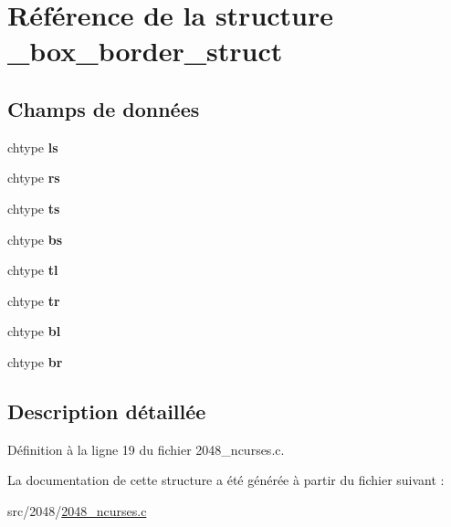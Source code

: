 \hypertarget{struct__box__border__struct}{
\section{Référence de la structure \_\-box\_\-border\_\-struct}
\label{struct__box__border__struct}
}
\subsection*{Champs de données}
\begin{DoxyCompactItemize}
\item 
\hypertarget{struct__box__border__struct_abd02d40f8d96464f6dbe6ed060b3b41f}{
chtype {\bfseries ls}}
\label{struct__box__border__struct_abd02d40f8d96464f6dbe6ed060b3b41f}

\item 
\hypertarget{struct__box__border__struct_a05a226a5255a8f41758bf472b413d4b8}{
chtype {\bfseries rs}}
\label{struct__box__border__struct_a05a226a5255a8f41758bf472b413d4b8}

\item 
\hypertarget{struct__box__border__struct_a47e109d09ccf275373c5d506c4e02a33}{
chtype {\bfseries ts}}
\label{struct__box__border__struct_a47e109d09ccf275373c5d506c4e02a33}

\item 
\hypertarget{struct__box__border__struct_a8f26ca799654e1384cfdf8e2f28b684c}{
chtype {\bfseries bs}}
\label{struct__box__border__struct_a8f26ca799654e1384cfdf8e2f28b684c}

\item 
\hypertarget{struct__box__border__struct_a3765e16187b3db788f6f97068c1a4872}{
chtype {\bfseries tl}}
\label{struct__box__border__struct_a3765e16187b3db788f6f97068c1a4872}

\item 
\hypertarget{struct__box__border__struct_a6f4b92e965aa2ec4e51d3fb7fc94dea7}{
chtype {\bfseries tr}}
\label{struct__box__border__struct_a6f4b92e965aa2ec4e51d3fb7fc94dea7}

\item 
\hypertarget{struct__box__border__struct_aeb81c1bcfad2b8e2b922790d4ab98980}{
chtype {\bfseries bl}}
\label{struct__box__border__struct_aeb81c1bcfad2b8e2b922790d4ab98980}

\item 
\hypertarget{struct__box__border__struct_afbd7a41789a8c717fea5e56a3f4e8ff7}{
chtype {\bfseries br}}
\label{struct__box__border__struct_afbd7a41789a8c717fea5e56a3f4e8ff7}

\end{DoxyCompactItemize}


\subsection{Description détaillée}


Définition à la ligne 19 du fichier 2048\_\-ncurses.c.



La documentation de cette structure a été générée à partir du fichier suivant :\begin{DoxyCompactItemize}
\item 
src/2048/\hyperlink{2048__ncurses_8c}{2048\_\-ncurses.c}\end{DoxyCompactItemize}
